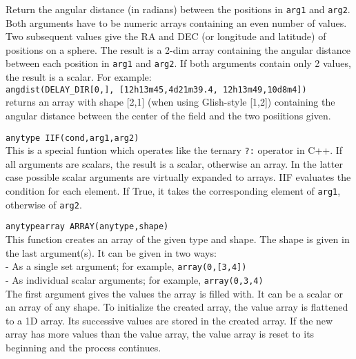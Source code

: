 \begin{description}
    Return the angular distance (in radians) between the
    positions in \texttt{arg1} and \texttt{arg2}. Both arguments have
    to be numeric arrays containing an even number of values. Two subsequent values 
    give the RA and DEC (or longitude and latitude) of positions on a
    sphere. The result is a 2-dim array containing the angular
    distance between each position in \texttt{arg1} and \texttt{arg2}.
    If both arguments contain only 2 values, the result is a scalar.
    For example:
    \\\texttt{angdist(DELAY\_DIR[0,], [12h13m45,4d21m39.4, 12h13m49,10d8m4])}
    \\returns an array with shape [2,1] (when using Glish-style [1,2])
    containing the angular
    distance between the center of the field and the two posiitions given. 
  \item[] \texttt{anytype IIF(cond,arg1,arg2)}\\
    This is a special funtion which operates like the ternary \texttt{?:}
    operator in C++. 
    If all arguments are scalars, the result is a scalar, otherwise
    an array. In the latter case possible scalar arguments are
    virtually expanded to arrays.
    IIF evaluates the condition for each element. If True, it takes
    the corresponding element of \texttt{arg1}, otherwise of \texttt{arg2}.
  \item[] \texttt{anytypearray ARRAY(anytype,shape)}\\
    This function creates an array of the given type and shape.
    The shape is given in the last argument(s).
    It can be given in two ways:
    \\- As a single set argument; for example, \texttt{array(0,[3,4])}
    \\- As individual scalar arguments; for example, \texttt{array(0,3,4)}
    \\The first argument gives the values the array is filled with.
    It can be a scalar or an array of any shape. To initialize the
    created array, the value array is flattened to a 1D array.
    Its successive values are stored in the created array. If the
    new array has more values than the value array, the value array is
    reset to its beginning and the process continues.
\end{description}

